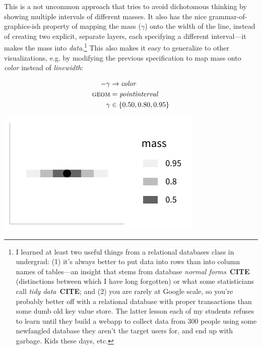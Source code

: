 \documentclass[journal]{vgtc}                     %
\begin{document}
This is a not uncommon approach that tries to avoid dichotomous thinking by showing multiple intervals of different masses. It also has the nice grammar-of-graphics-ish property of mapping the mass ($\gamma$) onto the width of the line, instead of creating two explicit, separate layers, each specifying a different interval---it makes the mass into \textit{data}.\footnote{I learned at least two useful things from a relational databases class in undergrad: (1) it's always better to put data into rows than into column names of tables---an insight that stems from database \textit{normal forms}~\textbf{CITE} (distinctions between which I have long forgotten) or what some statisticians call \textit{tidy data}~\textbf{CITE}; and (2) you are rarely at Google scale, so you're probably better off with a relational database with proper transactions than some dumb old key value store. The latter lesson each of my students refuses to learn until they build a webapp to collect data from 300 people using some newfangled database they aren't the target users for, and end up with garbage. Kids these days, etc.} This also makes it easy to generalize to other visualizations, e.g. by modifying the previous specification to map mass onto \textit{color} instead of \textit{linewidth}:


\noindent
\begin{minipage}{.5\columnwidth}

\begin{align*}
-\gamma &\rightarrow \mathit{color}\\
\textsc{geom} &= \mathit{pointinterval}\\
\gamma &\in \{0.50, 0.80, 0.95\}
\end{align*}
\end{minipage}%
  \begin{minipage}{.4\columnwidth}
    \centering
    \includegraphics[width=1.2\columnwidth]{figs/3-stat_pointinterval_color.pdf}
  \end{minipage}
\hfill\break
\end{document}
